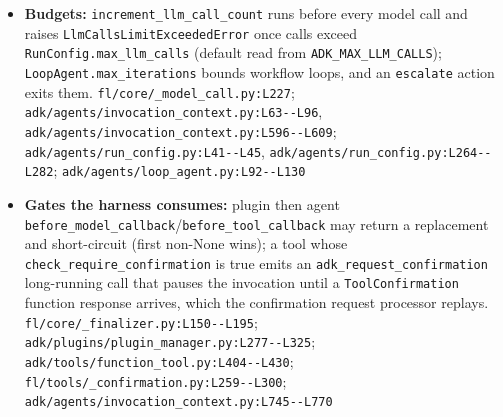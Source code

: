 \begin{itemize}
\item \textbf{Budgets:} \texttt{increment\_\allowbreak{}llm\_\allowbreak{}call\_\allowbreak{}count} runs before every model call and raises \texttt{LlmCallsLimitExceededError} once calls exceed \texttt{RunConfig.\allowbreak{}max\_\allowbreak{}llm\_\allowbreak{}calls} (default read from \texttt{ADK\_\allowbreak{}MAX\_\allowbreak{}LLM\_\allowbreak{}CALLS}); \texttt{LoopAgent.\allowbreak{}max\_\allowbreak{}iterations} bounds workflow loops, and an \texttt{escalate} action exits them. \texttt{fl/\allowbreak{}core/\allowbreak{}\_\allowbreak{}model\_\allowbreak{}call.\allowbreak{}py:\allowbreak{}L227}; \texttt{adk/\allowbreak{}agents/\allowbreak{}invocation\_\allowbreak{}context.\allowbreak{}py:\allowbreak{}L63-\allowbreak{}-\allowbreak{}L96}, \texttt{adk/\allowbreak{}agents/\allowbreak{}invocation\_\allowbreak{}context.\allowbreak{}py:\allowbreak{}L596-\allowbreak{}-\allowbreak{}L609}; \texttt{adk/\allowbreak{}agents/\allowbreak{}run\_\allowbreak{}config.\allowbreak{}py:\allowbreak{}L41-\allowbreak{}-\allowbreak{}L45}, \texttt{adk/\allowbreak{}agents/\allowbreak{}run\_\allowbreak{}config.\allowbreak{}py:\allowbreak{}L264-\allowbreak{}-\allowbreak{}L282}; \texttt{adk/\allowbreak{}agents/\allowbreak{}loop\_\allowbreak{}agent.\allowbreak{}py:\allowbreak{}L92-\allowbreak{}-\allowbreak{}L130}
\item \textbf{Gates the harness consumes:} plugin then agent \texttt{before\_\allowbreak{}model\_\allowbreak{}callback}/\texttt{before\_\allowbreak{}tool\_\allowbreak{}callback} may return a replacement and short-circuit (first non-None wins); a tool whose \texttt{check\_\allowbreak{}require\_\allowbreak{}confirmation} is true emits an \texttt{adk\_\allowbreak{}request\_\allowbreak{}confirmation} long-running call that pauses the invocation until a \texttt{ToolConfirmation} function response arrives, which the confirmation request processor replays. \texttt{fl/\allowbreak{}core/\allowbreak{}\_\allowbreak{}finalizer.\allowbreak{}py:\allowbreak{}L150-\allowbreak{}-\allowbreak{}L195}; \texttt{adk/\allowbreak{}plugins/\allowbreak{}plugin\_\allowbreak{}manager.\allowbreak{}py:\allowbreak{}L277-\allowbreak{}-\allowbreak{}L325}; \texttt{adk/\allowbreak{}tools/\allowbreak{}function\_\allowbreak{}tool.\allowbreak{}py:\allowbreak{}L404-\allowbreak{}-\allowbreak{}L430}; \texttt{fl/\allowbreak{}tools/\allowbreak{}\_\allowbreak{}confirmation.\allowbreak{}py:\allowbreak{}L259-\allowbreak{}-\allowbreak{}L300}; \texttt{adk/\allowbreak{}agents/\allowbreak{}invocation\_\allowbreak{}context.\allowbreak{}py:\allowbreak{}L745-\allowbreak{}-\allowbreak{}L770}

\end{itemize}
